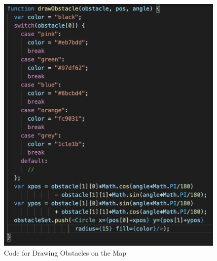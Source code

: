 \documentclass[a4paper]{article}
\begin{document}
\begin{figure}
	\begin{Center}
		\includegraphics[width = 0.9\linewidth]{./images/DrawObstacle.png}
		\caption{Code for Drawing Obstacles on the Map}
        \label{fig:drawobstaclecode}
	\end{Center}
\end{figure}
\end{document}

